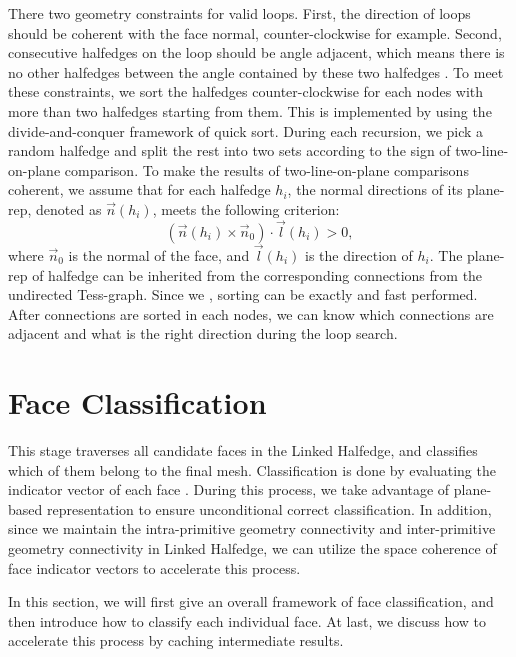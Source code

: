 \documentclass[10pt,journal,compsoc]{IEEEtran}
\begin{document}
There two geometry constraints for valid loops. First, the direction of loops should be coherent with the face normal, counter-clockwise for example. Second, consecutive halfedges on the loop should be angle adjacent, which means there is no other halfedges between the angle contained by these two halfedges {\color{red}{Fig.?}}. To meet these constraints, we sort the halfedges counter-clockwise for each nodes with more than two halfedges starting from them. This is implemented by using the divide-and-conquer framework of quick sort. During each recursion, we pick a random halfedge and split the rest into two sets according to the sign of two-line-on-plane comparison. To make the results of two-line-on-plane comparisons coherent, we assume that for each halfedge $h_i$, the normal directions of its plane-rep, denoted as $\vec{n}(h_i)$, meets the following criterion:
\begin{equation}
(\vec{n}(h_i) \times \vec{n}_0) \cdot \vec{l}(h_i) > 0,
\end{equation}
where $\vec{n}_0$ is the normal of the face, and $\vec{l}(h_i)$ is the direction of $h_i$. The plane-rep of halfedge can be inherited from the corresponding connections from the undirected Tess-graph. Since we {\color{red}{guarantee that each connection has a plane-rep //need insert//}}, sorting can be exactly and fast performed. After connections are sorted in each nodes, we can know which connections are adjacent and what is the right direction during the loop search.


\section{Face Classification}

\label{sec:classification}
This stage traverses all candidate faces in the Linked Halfedge, and classifies which of them belong to the final mesh. Classification is done by evaluating the indicator vector of each face {\color{red}{(indicator vector?)}}. During this process, we take advantage of plane-based representation to ensure unconditional correct classification. In addition, since we maintain the intra-primitive geometry connectivity and inter-primitive geometry connectivity in Linked Halfedge, we can utilize the space coherence of face indicator vectors to accelerate this process.

In this section, we will first give an overall framework of face classification, and then introduce how to classify each individual face. At last, we discuss how to accelerate this process by caching intermediate results.
\end{document}
